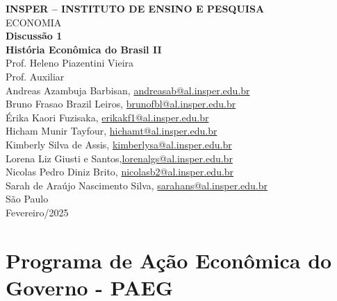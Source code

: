 \documentclass[a4paper,12pt]{article}[abntex2]
\begin{document}
\begin{titlepage}
    \centering
    \vspace*{1cm}
    \Large\textbf{INSPER – INSTITUTO DE ENSINO E PESQUISA}\\
    \Large ECONOMIA\\
    \vspace{1.5cm}
    \Large\textbf{Discussão 1}\\
    \textbf{História Econômica do Brasil II}\\
    \vspace{1.5cm}
    Prof. Heleno Piazentini Vieira \\
    Prof. Auxiliar  \\
    \vfill
    \normalsize
    Andreas Azambuja Barbisan, \href{mailto:andreasab@al.insper.edu.br}{andreasab@al.insper.edu.br}\\
    Bruno Frasao Brazil Leiros, \href{mailto:brunofbl@al.insper.edu.br}{brunofbl@al.insper.edu.br}\\
    Érika Kaori Fuzisaka, \href{mailto:erikakf1@al.insper.edu.br}{erikakf1@al.insper.edu.br}\\
    Hicham Munir Tayfour, \href{mailto:hichamt@al.insper.edu.br}{hichamt@al.insper.edu.br}\\
    Kimberly Silva de Assis, \href{mailto:kimberlysa@al.insper.edu.br}{kimberlysa@al.insper.edu.br}\\
    Lorena Liz Giusti e Santos,\href{mailto:lorenalgs@al.insper.edu.br}{lorenalgs@al.insper.edu.br}\\
    Nicolas Pedro Diniz Brito, \href{mailto:nicolasb2@al.insper.edu.br}{nicolasb2@al.insper.edu.br}\\
    Sarah de Araújo Nascimento Silva, \href{mailto:sarahans@al.insper.edu.br}{sarahans@al.insper.edu.br}\\


    \vfill
    São Paulo\\
    Fevereiro/2025
\end{titlepage}

\newpage
\tableofcontents
\thispagestyle{empty} %

\newpage
\setcounter{page}{1} %
\justify
\onehalfspacing

\section{\textbf{Programa de Ação Econômica do Governo - PAEG}}
\end{document}
